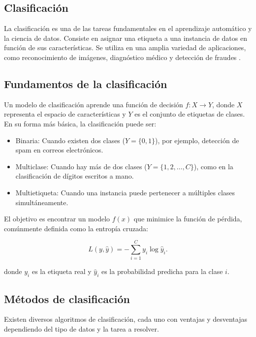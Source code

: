 \begin{itemize}
		\section{Clasificación}
		
		La clasificación es una de las tareas fundamentales en el aprendizaje automático y la ciencia de datos. Consiste en asignar una etiqueta a una instancia de datos en función de sus características. Se utiliza en una amplia variedad de aplicaciones, como reconocimiento de imágenes, diagnóstico médico y detección de fraudes \cite{hastie2009elements}.
		
		\subsection{Fundamentos de la clasificación}
		
		Un modelo de clasificación aprende una función de decisión \( f: X \to Y \), donde \( X \) representa el espacio de características y \( Y \) es el conjunto de etiquetas de clases. En su forma más básica, la clasificación puede ser:
		
		\begin{itemize}
			\item Binaria: Cuando existen dos clases (\( Y = \{0,1\} \)), por ejemplo, detección de spam en correos electrónicos.
			\item Multiclase: Cuando hay más de dos clases (\( Y = \{1,2, \dots, C\} \)), como en la clasificación de dígitos escritos a mano.
			\item Multietiqueta: Cuando una instancia puede pertenecer a múltiples clases simultáneamente.
		\end{itemize}
		
		El objetivo es encontrar un modelo \( f(x) \) que minimice la función de pérdida, comúnmente definida como la entropía cruzada:
		
		\begin{equation}
			L(y, \hat{y}) = - \sum_{i=1}^{C} y_i \log \hat{y}_i.
		\end{equation}
		
		donde \( y_i \) es la etiqueta real y \( \hat{y}_i \) es la probabilidad predicha para la clase \( i \).
		
		\subsection{Métodos de clasificación}
		
		Existen diversos algoritmos de clasificación, cada uno con ventajas y desventajas dependiendo del tipo de datos y la tarea a resolver.
		

\end{itemize}
